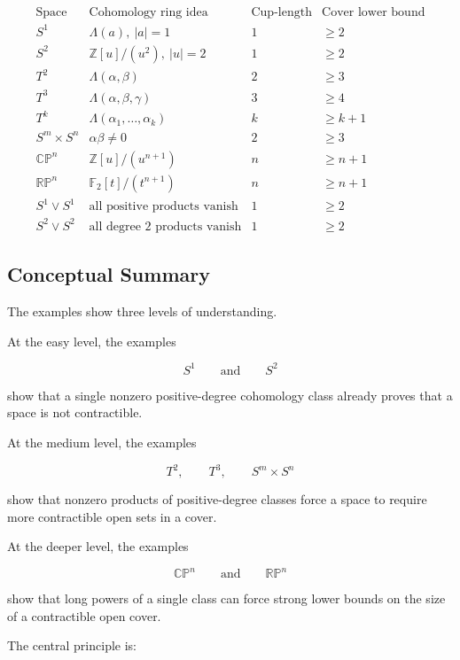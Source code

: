 \documentclass[12pt,a4paper]{article}
\theoremstyle{notespace}
\begin{document}
\[
\begin{array}{c|c|c|c}
	\text{Space}
	&
	\text{Cohomology ring idea}
	&
	\text{Cup-length}
	&
	\text{Cover lower bound}
	\\
	\hline
	S^1
	&
	\Lambda(a),\ |a|=1
	&
	1
	&
	\geq 2
	\\
	S^2
	&
	\mathbb Z[u]/(u^2),\ |u|=2
	&
	1
	&
	\geq 2
	\\
	T^2
	&
	\Lambda(\alpha,\beta)
	&
	2
	&
	\geq 3
	\\
	T^3
	&
	\Lambda(\alpha,\beta,\gamma)
	&
	3
	&
	\geq 4
	\\
	T^k
	&
	\Lambda(\alpha_1,\dots,\alpha_k)
	&
	k
	&
	\geq k+1
	\\
	S^m\times S^n
	&
	\alpha\beta\neq 0
	&
	2
	&
	\geq 3
	\\
	\mathbb{CP}^n
	&
	\mathbb Z[u]/(u^{n+1})
	&
	n
	&
	\geq n+1
	\\
	\mathbb{RP}^n
	&
	\mathbb F_2[t]/(t^{n+1})
	&
	n
	&
	\geq n+1
	\\
	S^1\vee S^1
	&
	\text{all positive products vanish}
	&
	1
	&
	\geq 2
	\\
	S^2\vee S^2
	&
	\text{all degree }2\text{ products vanish}
	&
	1
	&
	\geq 2
\end{array}
\]

\subsection{Conceptual Summary}

The examples show three levels of understanding.

At the easy level, the examples

\[
S^1
\qquad
\text{and}
\qquad
S^2
\]

show that a single nonzero positive-degree cohomology class already proves that a space is not contractible.

At the medium level, the examples

\[
T^2,
\qquad
T^3,
\qquad
S^m\times S^n
\]

show that nonzero products of positive-degree classes force a space to require more contractible open sets in a cover.

At the deeper level, the examples

\[
\mathbb{CP}^n
\qquad
\text{and}
\qquad
\mathbb{RP}^n
\]

show that long powers of a single class can force strong lower bounds on the size of a contractible open cover.

The central principle is:
\end{document}
